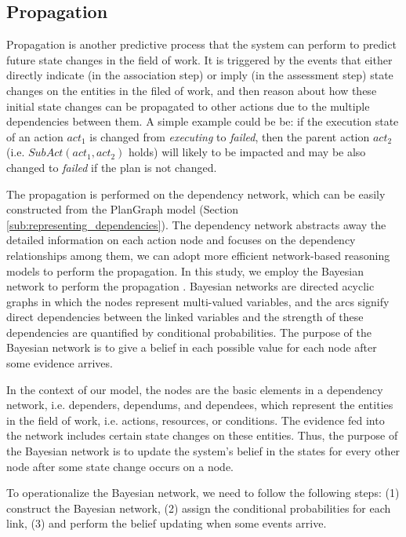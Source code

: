 \subsection{Propagation} %
\label{sub:propagation}
Propagation is another predictive process that the system can perform to predict future state changes in the field of work. It is triggered by the events that either directly indicate (in the association step) or imply (in the assessment step) state changes on the entities in the filed of work, and then reason about how these initial state changes can be propagated to other actions due to the multiple dependencies between them. A simple example could be be: if the execution state of an action $act_1$ is changed from \emph{executing} to \emph{failed}, then the parent action $act_2$ (i.e. $SubAct(act_1, act_2)$ holds) will likely to be impacted and may be also changed to \emph{failed} if the plan is not changed. 

The propagation is performed on the dependency network, which can be easily constructed from the PlanGraph model (Section \ref{sub:representing_dependencies}). The dependency network abstracts away the detailed information on each action node and focuses on the dependency relationships among them, we can adopt more efficient network-based reasoning models to perform the propagation. In this study, we employ the Bayesian network to perform the propagation \cite{pearl1988probabilistic}. Bayesian networks are directed acyclic graphs in which the nodes represent multi-valued variables, and the arcs signify direct dependencies between the linked variables and the strength of these dependencies are quantified by conditional probabilities. The purpose of the Bayesian network is to give a belief in each possible value for each node after some evidence arrives.

In the context of our model, the nodes are the basic elements in a dependency network, i.e. dependers, dependums, and dependees, which represent the entities in the field of work, i.e.  actions, resources, or conditions. The evidence fed into the network includes certain state changes on these entities. Thus, the purpose of the Bayesian network is to update the system’s belief in the states for every other node after some state change occurs on a node.

To operationalize the Bayesian network, we need to follow the following steps: (1) construct the Bayesian network, (2) assign the conditional probabilities for each link, (3) and perform the belief updating when some events arrive.

